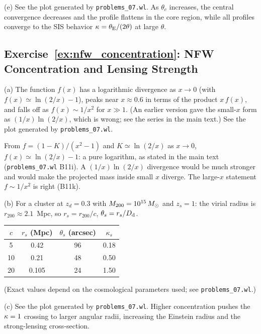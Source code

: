 (e) See the plot generated by
\texttt{problems\_07.wl}. As $\theta_c$ increases, the central
convergence decreases and the profile flattens in the core region,
while all profiles converge to the SIS behavior $\kappa = \theta_{\mathrm{E}}/(2\theta)$
at large $\theta$.


\subsection*{Exercise~\ref{ex:nfw_concentration}: NFW Concentration and Lensing Strength}

(a) The function $f(x)$ has a logarithmic divergence as
$x \to 0$ (with $f(x) \simeq \ln(2/x) - 1$), peaks near $x \approx 0.6$
in terms of the product $x\,f(x)$, and falls off as $f(x) \sim 1/x^2$
for $x \gg 1$.  (An earlier version gave the small-$x$ form as
$(1/x)\ln(2/x)$, which is wrong; see the series in the main text.)  See the
plot generated by \texttt{problems\_07.wl}.

\begin{annotation}
From $f = (1-K)/(x^2-1)$ and $K\simeq\ln(2/x)$ as $x\to0$,
$f(x)\simeq\ln(2/x)-1$: a pure logarithm, as stated in the main text
(\texttt{problems\_07.wl} B11i).  A $(1/x)\ln(2/x)$ divergence would be much
stronger and would make the projected mass inside small $x$ diverge.  The
large-$x$ statement
$f\sim1/x^2$ is right (B11k).
\end{annotation}

(b) For a cluster at $z_d = 0.3$ with $M_{200} = 10^{15}\,M_{\odot}$
and $z_s = 1$: the virial radius is $r_{200} \approx 2.1$~Mpc, so
$r_s = r_{200}/c$, $\theta_s = r_s/D_{\mathrm{d}}$.
\begin{center}
\begin{tabular}{cccc}
\toprule
$c$ & $r_s$ (Mpc) & $\theta_s$ (arcsec) & $\kappa_s$ \\
\midrule
5 & 0.42 & 96 & 0.18 \\
10 & 0.21 & 48 & 0.50 \\
20 & 0.105 & 24 & 1.50 \\
\bottomrule
\end{tabular}
\end{center}
(Exact values depend on the cosmological parameters used; see
\texttt{problems\_07.wl}.)

(c) See the plot generated by \texttt{problems\_07.wl}.
Higher concentration pushes the $\kappa = 1$ crossing to larger
angular radii, increasing the Einstein radius and the strong-lensing
cross-section.

